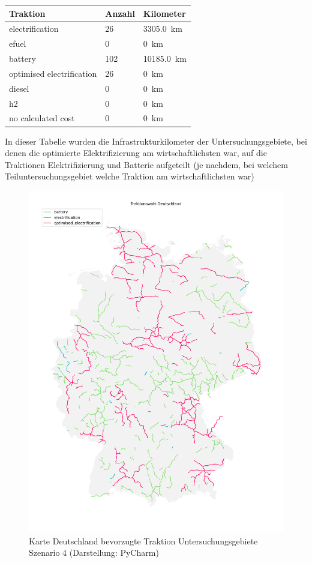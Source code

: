 \begin{center}
	\begin{tabularx}{\textwidth}{X | X | X} Traktion & Anzahl & Kilometer \\
	\hline
            electrification & \num{26} &  \SI{3305.0}{\km}\\
            efuel & \num{0} &  \SI{0}{\km}\\
            battery & \num{102} &  \SI{10185.0}{\km}\\
            optimised electrification & \num{26} &  \SI{0}{\km}\\
            diesel & \num{0} &  \SI{0}{\km}\\
            h2 & \num{0} &  \SI{0}{\km}\\
            no calculated cost & \num{0} &  \SI{0}{\km}\\
    	\end{tabularx}
\end{center}
In dieser Tabelle wurden die Infrastrukturkilometer der Untersuchungsgebiete, bei denen die optimierte Elektrifizierung am wirtschaftlichsten war, auf die Traktionen Elektrifizierung und Batterie aufgeteilt (je nachdem, bei welchem Teiluntersuchungsgebiet welche Traktion am wirtschaftlichsten war)

\begin{center}
	\begin{figure}[!h]
	\includegraphics[height=0.8\paperheight]{../report_scenarios/s_4/files/deutschland_map.png}
	\caption{\label{fig_s_4_d_map} Karte Deutschland bevorzugte Traktion Untersuchungsgebiete Szenario 4 (Darstellung: PyCharm)}
	\end{figure}
\end{center}